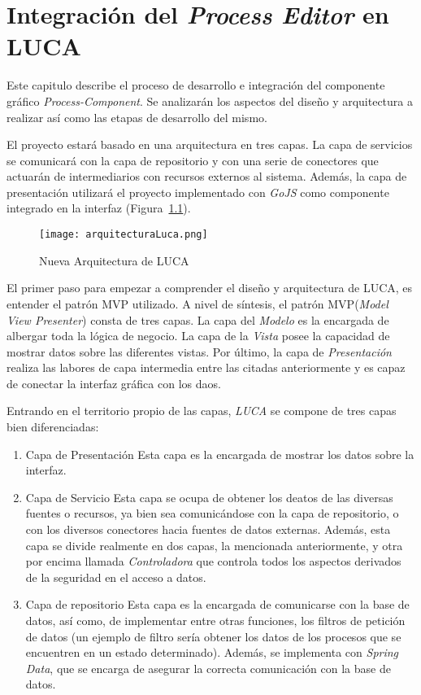 \chapter{Integración del \emph{Process Editor} en LUCA}
	
Este capitulo describe el proceso de desarrollo e integración del componente gráfico \emph{Process-Component}. Se analizarán los aspectos del diseño y arquitectura a realizar así como las etapas de desarrollo del mismo.
	

El proyecto estará basado en una arquitectura en tres capas. La capa de servicios se comunicará con la capa de repositorio y con una serie de conectores que actuarán de intermediarios con recursos externos al sistema. Además, la capa de presentación utilizará el proyecto implementado con \emph{GoJS} como componente integrado en la interfaz (Figura~\ref{fig:arquitecturaLuca}).

\begin{figure}[H]
	\centering
	\texttt{[image: arquitecturaLuca.png]}
	\caption{Nueva Arquitectura de LUCA}\label{fig:arquitecturaLuca}
\end{figure}


El primer paso para empezar a comprender el diseño y arquitectura de LUCA, es entender el patrón MVP\cite{mvp} utilizado.
A nivel de síntesis, el patrón MVP(\emph{Model View Presenter}) consta de tres capas. La capa del \emph{Modelo} es la encargada de albergar toda la lógica de negocio. La capa de la \emph{Vista} posee la capacidad de mostrar datos sobre las diferentes vistas. Por último, la capa de \emph{Presentación} realiza las labores de capa intermedia entre las citadas anteriormente y es capaz de conectar la interfaz gráfica con los daos.


Entrando en el territorio propio de las capas, \emph{LUCA} se compone de tres capas bien diferenciadas:

\begin{enumerate}
	\item Capa de Presentación \subitem Esta capa es la encargada de mostrar los datos sobre la interfaz.
	\item Capa de Servicio \subitem Esta capa se ocupa de obtener los deatos de las diversas fuentes o recursos, ya bien sea comunicándose con la capa de repositorio, o con los diversos conectores hacia fuentes de datos externas. Además, esta capa se divide realmente en dos capas, la mencionada anteriormente, y otra por encima llamada \emph{Controladora} que controla todos los aspectos derivados de la seguridad en el acceso a datos.
	\item Capa de repositorio \subitem Esta capa es la encargada de comunicarse con la base de datos, así como, de implementar entre otras funciones, los filtros de petición de datos (un ejemplo de filtro sería obtener los datos de los procesos que se encuentren en un estado determinado). Además, se implementa con \emph{Spring Data}\cite{jpa}, que se encarga de asegurar la correcta comunicación con la base de datos.
\end{enumerate}



